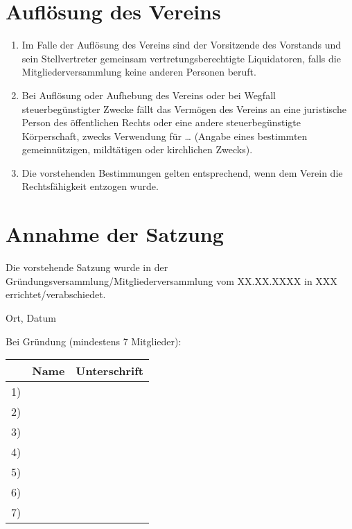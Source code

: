 \documentclass{scrartcl}
\begin{document}
\section{Auflösung des Vereins}

\begin{contract}
\begin{enumerate}
    \item  Im Falle der Auflösung des Vereins sind der Vorsitzende des Vorstands und sein Stellvertreter gemeinsam vertretungsberechtigte Liquidatoren, falls die Mitgliederversammlung keine anderen Personen beruft.
    \item Bei Auflösung oder Aufhebung des Vereins oder bei Wegfall steuerbegünstigter Zwecke fällt das Vermögen des Vereins an eine juristische Person des öffentlichen Rechts oder eine  andere steuerbegünstigte Körperschaft, zwecks Verwendung für … (Angabe eines bestimmten gemeinnützigen, mildtätigen oder kirchlichen Zwecks).
    \item Die vorstehenden Bestimmungen gelten entsprechend, wenn dem Verein die Rechtsfähigkeit entzogen wurde.
\end{enumerate}
\end{contract}

\pagebreak
\section{Annahme der Satzung}
Die vorstehende Satzung wurde in der Gründungsversammlung/Mitgliederversammlung vom XX.XX.XXXX in XXX errichtet/verabschiedet. 

\vspace{2cm}
Ort, Datum

Bei Gründung (mindestens 7 Mitglieder):

\begin{tabular}{r p{} p{}}
    & Name & Unterschrift \\ \midrule
    1) \vspace{1.5cm}    & & \\ \midrule
    2) \vspace{1.5cm}    & & \\ \midrule
    3) \vspace{1.5cm}    & & \\ \midrule
    4) \vspace{1.5cm}    & & \\ \midrule
    5) \vspace{1.5cm}    & & \\ \midrule
    6) \vspace{1.5cm}    & & \\ \midrule
    7) \vspace{1.5cm}    & & \\ \midrule
\end{tabular}
\end{document}
